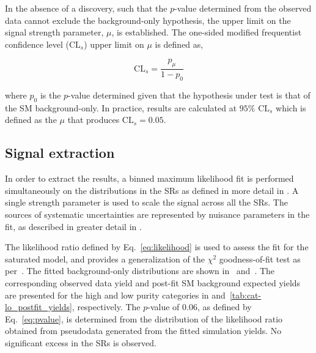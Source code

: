 In the absence of a discovery, such that the $p$-value determined from the observed data cannot exclude the background-only hypothesis, the upper limit on the signal strength parameter, $\mu$, is established. The one-sided modified frequentist confidence level ($\textrm{CL}_s$) upper limit on $\mu$ is defined as,

\begin{equation}
  \textrm{CL}_{s} = \frac{p_\mu}{1-p_0}
  \label{eq:CLs}
\end{equation} 

where $p_{0}$ is the $p$-value determined given that the hypothesis under test is that of the SM background-only. In practice, results are calculated at $95\%$ $\textrm{CL}_s$ which is defined as the $\mu$ that produces $\textrm{CL}_s=0.05$.

\subsection{Signal extraction}
\label{subsec:signal}

In order to extract the results, a binned maximum likelihood fit is performed simultaneously on the \ptmiss distributions in the SRs as defined in more detail in . A single strength parameter is used to scale the signal across all the SRs. The sources of systematic uncertainties are represented by nuisance parameters in the fit, as described in greater detail in .

The likelihood ratio defined by Eq.~\ref{eq:likelihood} is used to assess the fit for the saturated model, and provides a generalization of the $\chi^2$ goodness-of-fit test as per~\cite{BAKER1984437}. The fitted background-only \ptmiss distributions are shown in~ and~. The corresponding observed data yield and post-fit SM background expected yields are presented for the high and low purity categories in  and~\ref{tab:cat-lo_postfit_yields}, respectively. The $p$-value of 0.06, as defined by Eq.~\ref{eq:pvalue}, is determined from the distribution of the likelihood ratio obtained from pseudodata generated from the fitted simulation yields. No significant excess in the SRs is observed. 


